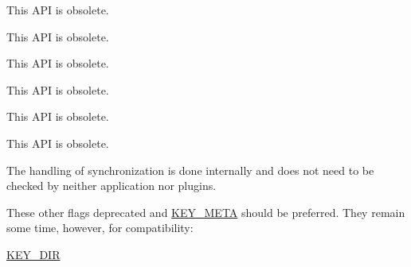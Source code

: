 \begin{DoxyRefList}
\item[\label{deprecated__deprecated000018}%
\hypertarget{deprecated__deprecated000018}{}%
Global \hyperlink{group__meta_ga6b05da399c3c78904969ef39f191b0eb}{key\+Get\+A\+Time} (const Key $\ast$key)]This A\+P\+I is obsolete. 
\item[\label{deprecated__deprecated000022}%
\hypertarget{deprecated__deprecated000022}{}%
Global \hyperlink{group__meta_ga2c213c120cbe02201278ef7fb8cd94be}{key\+Get\+C\+Time} (const Key $\ast$key)]This A\+P\+I is obsolete. 
\item[\label{deprecated__deprecated000013}%
\hypertarget{deprecated__deprecated000013}{}%
Global \hyperlink{group__meta_ga46a95e81d7d7f4e3eb59e60e5f3738c0}{key\+Get\+G\+I\+D} (const Key $\ast$key)]This A\+P\+I is obsolete. 
\item[\label{deprecated__deprecated000016}%
\hypertarget{deprecated__deprecated000016}{}%
Global \hyperlink{group__meta_gabc0cec592ce3b77e9bc33dbc8e8f6bdc}{key\+Get\+Mode} (const Key $\ast$key)]This A\+P\+I is obsolete. 
\item[\label{deprecated__deprecated000020}%
\hypertarget{deprecated__deprecated000020}{}%
Global \hyperlink{group__meta_ga57689eb5691679071463b777ae786ae9}{key\+Get\+M\+Time} (const Key $\ast$key)]This A\+P\+I is obsolete. 
\item[\label{deprecated__deprecated000011}%
\hypertarget{deprecated__deprecated000011}{}%
Global \hyperlink{group__meta_gacaa5060e67b03f50ae49a3620c54bc46}{key\+Get\+U\+I\+D} (const Key $\ast$key)]This A\+P\+I is obsolete. 
\item[\label{deprecated__deprecated000010}%
\hypertarget{deprecated__deprecated000010}{}%
Global \hyperlink{group__keytest_gaf247df0de7aca04b32ef80e39ef12950}{key\+Need\+Sync} (const Key $\ast$key)]The handling of synchronization is done internally and does not need to be checked by neither application nor plugins. 
\item[\label{deprecated__deprecated000008}%
\hypertarget{deprecated__deprecated000008}{}%
Global \hyperlink{group__key_gad23c65b44bf48d773759e1f9a4d43b89}{key\+New} (const char $\ast$name,...)]These other flags deprecated and \hyperlink{group__key_gga91fb3178848bd682000958089abbaf40a040582834bb2d90049947d7ef74e87e2}{K\+E\+Y\+\_\+\+M\+E\+T\+A} should be preferred. They remain some time, however, for compatibility\+:
\begin{DoxyItemize}
\item \hyperlink{group__key_gga91fb3178848bd682000958089abbaf40a9e43e47c8a21478538e2d20e049981d5}{K\+E\+Y\+\_\+\+D\+I\+R} ~\newline

\end{DoxyItemize}
\end{DoxyRefList}
